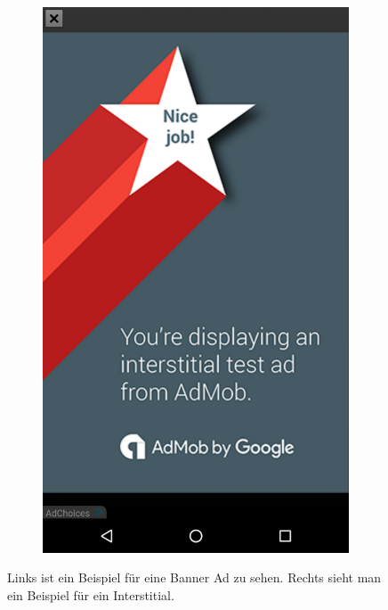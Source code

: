 \documentclass[FIPLY_base.tex]{subfiles}
\begin{document}
\begin{figure}[h]
\begin{subfigure}[b]{0.3\textwidth}
	\includegraphics[scale=0.15]{img/adsInterstitial}
	\end{subfigure}
	\caption{Links ist ein Beispiel für eine Banner Ad zu sehen. \newline Rechts sieht man ein Beispiel für ein Interstitial.}
\end{figure}

\newpage
\end{document}
